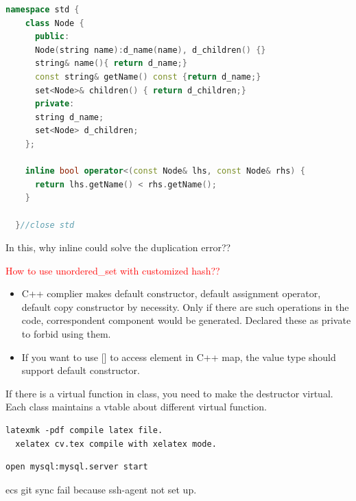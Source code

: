 \documentclass[a4paper]{tufte-handout}
\begin{document}
\begin{lstlisting}[language=c++]
  namespace std {
    class Node {
      public:
      Node(string name):d_name(name), d_children() {}
      string& name(){ return d_name;}
      const string& getName() const {return d_name;}
      set<Node>& children() { return d_children;}
      private:
      string d_name;
      set<Node> d_children;
    };

    inline bool operator<(const Node& lhs, const Node& rhs) {
      return lhs.getName() < rhs.getName();
    }

  }//close std

\end{lstlisting}
In this, why inline could solve the duplication error??

\textcolor{red}{How to use unordered\_set with customized hash??}
\begin{itemize}
\item C++ complier makes default constructor, default assignment operator, default copy constructor by necessity. Only if there are such operations in the code, correspondent component would be generated. Declared these as private to forbid using them.\\
\item If you want to use [] to access element in C++ map, the value type should support default constructor.
\end{itemize}

If there is a virtual function in class, you need to make the destructor virtual.
Each class maintains a vtable about different virtual function.

\begin{lstlisting}[]
  latexmk -pdf compile latex file.
  xelatex cv.tex compile with xelatex mode.
\end{lstlisting}

\begin{lstlisting}
open mysql:mysql.server start
\end{lstlisting}

ecs git sync fail because ssh-agent not set up.\\





\end{document}
